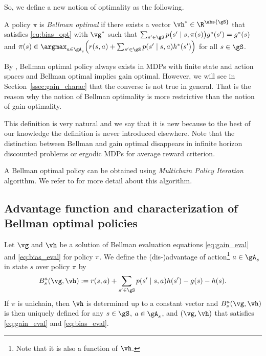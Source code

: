 So, we define a new notion of optimality as the following.
\begin{defn}
    \label{ch:mdp:defn:bellman}
    A policy $\pi$ is \emph{Bellman optimal} if there exists a vector $\vh^*\in\R^{\abs{\gS}}$ that satisfies \eqref{eq:bias_opt} with $\vg^*$ such that $\sum_{s'\in\gS}p\bigl(s'\mid s,\pi(s)\bigr)g^*(s')=g^*(s)$ and $\pi(s)\in\argmax_{a\in\gA_s}\Big(r(s,a) +\sum_{s'\in\gS}p(s'\mid s,a)h^*(s')\Big)$ for all $s\in\gS$.
\end{defn}
By \cite[Theorem~9.1.7]{puterman2014markov}, Bellman optimal policy always exists in MDPs with finite state and action spaces and Bellman optimal implies gain optimal.
However, we will see in Section~\ref{ssec:gain_charac} that the converse is not true in general.
That is the reason why the notion of Bellman optimality is more restrictive than the notion of gain optimality.

This definition is very natural and we say that it is new because to the best of our knowledge the definition is never introduced elsewhere.
Note that the distinction between Bellman and gain optimal disappears in infinite horizon discounted problems or ergodic MDPs for average reward criterion.

A Bellman optimal policy can be obtained using \emph{Multichain Policy Iteration} algorithm.
We refer to \cite[Section~9.2.1]{puterman2014markov} for more detail about this algorithm.

\subsection{Advantage function and characterization of Bellman optimal policies}

Let $\vg$ and $\vh$ be a solution of Bellman evaluation equations \eqref{eq:gain_eval} and \eqref{eq:bias_eval} for policy $\pi$.
We define the (dis-)advantage of action\footnote{Note that it is also a function of $\vh$.} $a\in\gA_s$ in state $s$ over policy $\pi$ by
\begin{equation}
    \label{eq:advan}
    B^a_s(\vg,\vh) := r(s,a) +\sum_{s'\in\gS}p(s'\mid s,a)h(s') -g(s) -h(s).
\end{equation}
If $\pi$ is unichain, then $\vh$ is determined up to a constant vector and $B^a_s(\vg,\vh)$ is then uniquely defined for any $s\in\gS$, $a\in\gA_s$, and $(\vg,\vh)$ that satisfies \eqref{eq:gain_eval} and \eqref{eq:bias_eval}.

